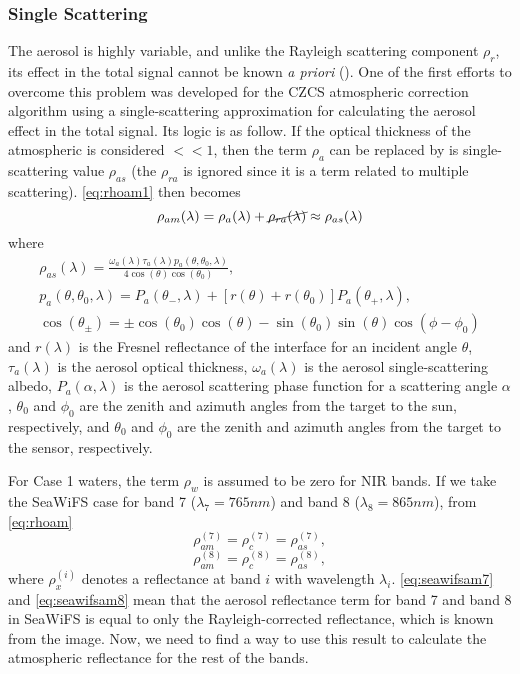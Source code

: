 \subsubsection{Single Scattering}
The aerosol is highly variable, and unlike the Rayleigh scattering component $\rho_r$, its effect in the total signal cannot be known {\it a priori} (\cite{Gordon:1994}). One of the first efforts to overcome this problem was developed for the CZCS atmospheric correction algorithm using a single-scattering approximation for calculating the aerosol effect in the total signal. Its logic is as follow. If the optical thickness of the atmospheric is considered $<<1$, then the term $\rho_a$ can be replaced by is single-scattering value $\rho_{as}$ (the $\rho_{ra}$ is ignored since it is a term related to multiple scattering). \autoref{eq:rhoam1} then becomes
\begin{equation}\label{eq:singleapprox}
  \rho_{am}(\lambda) = \rho_a(\lambda)+\cancel{\rho_{ra}(\lambda)} \approx \rho_{as}(\lambda)
\end{equation}
where
\begin{equation}\label{eq:rhoas}
  \begin{gathered}
    \rho_{as}(\lambda) = \frac{\omega_a(\lambda)\tau_a(\lambda)p_a(\theta,\theta_0,\lambda)}{4\cos(\theta)\cos(\theta_0)},\\  
    p_a(\theta,\theta_0,\lambda) = P_a(\theta_{-},\lambda) + [r(\theta)+r(\theta_0)]P_a(\theta_{+},\lambda),\\
    \cos(\theta_{\pm}) = \pm \cos(\theta_0)\cos(\theta)-\sin(\theta_0)\sin(\theta)\cos(\phi-\phi_0)
  \end{gathered}
\end{equation}
and $r(\lambda)$ is the Fresnel reflectance of the interface for an incident angle $\theta$, $\tau_a(\lambda)$ is the aerosol optical thickness, $\omega_a(\lambda)$ is the aerosol single-scattering albedo, $P_a(\alpha,\lambda)$ is the aerosol scattering phase function for a scattering angle $\alpha$, $\theta_0$ and $\phi_0$ are the zenith and azimuth angles from the target to the sun, respectively, and $\theta_0$ and $\phi_0$ are the zenith and azimuth angles from the target to the sensor, respectively. 


For Case 1 waters, the term $\rho_{w}$ is assumed to be zero for NIR bands. If we take the SeaWiFS case for band 7 ($\lambda_7=765nm$) and band 8 ($\lambda_8=865nm$), from \autoref{eq:rhoam}
\begin{equation}\label{eq:seawifsam7}
    \rho_{am}^{(7)} = \rho_{c}^{(7)} = \rho_{as}^{(7)},
\end{equation}
\begin{equation}\label{eq:seawifsam8}
    \rho_{am}^{(8)} = \rho_{c}^{(8)} = \rho_{as}^{(8)},
\end{equation}
where $\rho_{x}^{(i)}$ denotes a reflectance at band $i$ with wavelength $\lambda_i$. \autoref{eq:seawifsam7} and \autoref{eq:seawifsam8} mean that the aerosol reflectance term for band 7 and band 8 in SeaWiFS is equal to only the Rayleigh-corrected reflectance, which is known from the image. Now, we need to find a way to use this result to calculate the atmospheric reflectance for the rest of the bands.

